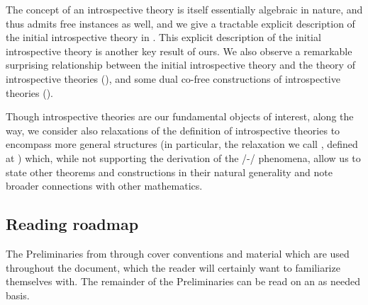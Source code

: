 The concept of an introspective theory is itself essentially algebraic in nature, and thus admits free instances as well, and we give a tractable explicit description of the initial introspective theory in . This explicit description of the initial introspective theory is another key result of ours. We also observe a remarkable surprising relationship between the initial introspective theory and the theory of introspective theories (), and some dual co-free constructions of introspective theories ().

Though introspective theories are our fundamental objects of interest, along the way, we consider also relaxations of the definition of introspective theories to encompass more general structures (in particular, the relaxation we call , defined at ) which, while not supporting the derivation of the \Godel/-\Lob/ phenomena, allow us to state other theorems and constructions in their natural generality and note broader connections with other mathematics.


\subsection{Reading roadmap}
The Preliminaries from  through  cover conventions and material which are used throughout the document, which the reader will certainly want to familiarize themselves with. The remainder of the Preliminaries can be read on an as needed basis.



\fileend
